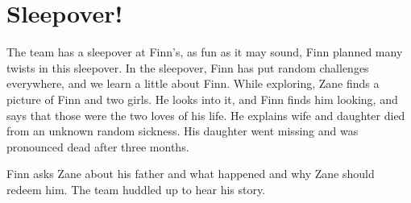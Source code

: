 \section{Sleepover!}
The team has a sleepover at Finn’s, as fun as it may sound, Finn planned many twists in this sleepover. 
In the sleepover, Finn has put random challenges everywhere, and we learn a little about Finn. While exploring, 
Zane finds a picture of Finn and two girls. He looks into it, and Finn finds him looking, and says that those were the two loves of his life. 
He explains wife and daughter died from an unknown random sickness. His daughter went missing and was pronounced dead after three months.

Finn asks Zane about his father and what happened and why Zane should redeem him. The team huddled up to hear his story.